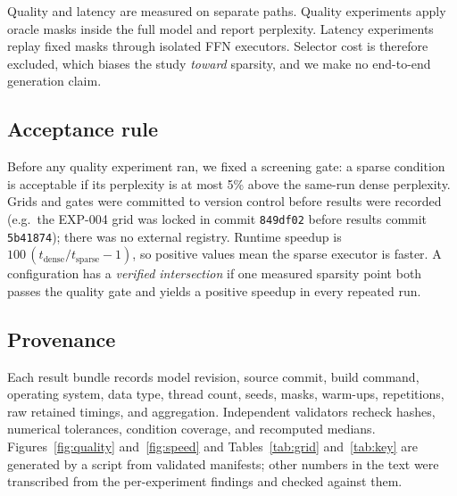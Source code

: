 Quality and latency are measured on separate paths. Quality experiments apply
oracle masks inside the full model and report perplexity. Latency experiments
replay fixed masks through isolated FFN executors. Selector cost is therefore
excluded, which biases the study \emph{toward} sparsity, and we make no
end-to-end generation claim.

\subsection{Acceptance rule}

Before any quality experiment ran, we fixed a screening gate: a sparse
condition is acceptable if its perplexity is at most 5\% above the same-run
dense perplexity. Grids and gates were committed to version control before
results were recorded (e.g.\ the EXP-004 grid was locked in commit
\texttt{849df02} before results commit \texttt{5b41874}); there was no external
registry. Runtime speedup is $100\,(t_{\text{dense}}/t_{\text{sparse}}-1)$, so
positive values mean the sparse executor is faster. A configuration has a
\emph{verified intersection} if one measured sparsity point both passes the
quality gate and yields a positive speedup in every repeated run.

\subsection{Provenance}

Each result bundle records model revision, source commit, build command,
operating system, data type, thread count, seeds, masks, warm-ups,
repetitions, raw retained timings, and aggregation. Independent validators
recheck hashes, numerical tolerances, condition coverage, and recomputed
medians. Figures~\ref{fig:quality} and~\ref{fig:speed} and
Tables~\ref{tab:grid} and~\ref{tab:key} are generated by a script from
validated manifests; other numbers in the text were transcribed from the
per-experiment findings and checked against them.
